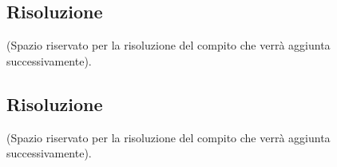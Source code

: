 \documentclass[12pt,a4paper]{article}
\begin{document}
\newpage
\subsection{Risoluzione}
(Spazio riservato per la risoluzione del compito che verrà aggiunta successivamente).

\newpage


\newpage
\subsection{Risoluzione}
(Spazio riservato per la risoluzione del compito che verrà aggiunta successivamente).
\end{document}
